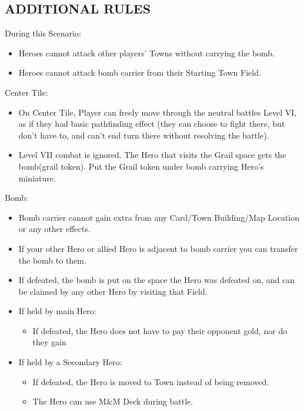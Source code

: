 \begin{multicols}{2}
\newpage

\subsection*{\MakeUppercase{Additional Rules}}

During this Scenario:

\begin{itemize}
  \item Heroes cannot attack other players' Towns without carrying the bomb.
  \item Heroes cannot attack bomb carrier from their Starting Town Field.
\end{itemize}

Center Tile:
\begin{itemize}
  \item On Center Tile, Player can freely move through the neutral battles Level VI, as if they had basic pathfinding effect (they can choose to fight there, but don't have to, and can't end turn there without resolving the battle).
  \item Level VII combat is ignored. The Hero that visits the Grail space gets the bomb(grail token). Put the Grail token under bomb carrying Hero's miniature.
\end{itemize}

Bomb:

\begin{itemize}
  \item Bomb carrier cannot gain extra  from any Card/Town Building/Map Location or any other effects.
  \item If your other Hero or allied Hero is adjacent to bomb carrier you can transfer the bomb to them.
  \item If defeated, the bomb is put on the space the Hero was defeated on, and can be claimed by any other Hero by visiting that Field.
  \item If held by main Hero:
  \begin{itemize}
    \item If defeated, the Hero does not have to pay their opponent gold, nor do they gain 
  \end{itemize}
  \item If held by a Secondary Hero:
  \begin{itemize}
    \item If defeated, the Hero is moved to Town instead of being removed.
    \item The Hero can use M\&M Deck during battle.
  \end{itemize}
\end{itemize}


\end{multicols}
